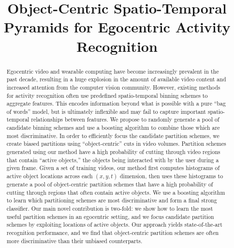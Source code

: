 \documentclass{bmvc2k}
\title{Object-Centric Spatio-Temporal Pyramids for Egocentric Activity Recognition}
\begin{document}
\maketitle

\begin{abstract}
	Egocentric video and wearable computing have become increasingly
	prevalent in the past decade, resulting in a huge explosion in the amount
	of available video content and increased attention from the computer
  vision community.
  However, existing methods for activity recognition often use
  predefined spatio-temporal binning schemes
  to aggregate features. This encodes information beyond what is possible
  with a pure ``bag of words'' model, but is ultimately inflexible
  and may fail to capture important spatio-temporal relationships between
  features.
  We propose to randomly generate a pool of candidate binning schemes and
  use a boosting algorithm to combine those which are most discriminative. 
  In order to efficiently focus the candidate partition schemes, we
  create biased partitions using ``object-centric'' cuts in video volumes.
  Partition schemes generated using our method have a high probability of
  cutting through video regions that contain ``active objects,'' the objects
  being interacted with by the user during a given frame.
  Given a set of training videos, our method first computes histograms of
  active object locations across each $(x, y, t)$ dimension, then uses these
  histograms to generate a pool of object-centric partition schemes that
  have a high probability of cutting through regions that often contain
  active objects.
	We use a boosting algorithm to learn which partitioning schemes are
  most discriminative and form a
	final strong classifier. Our main novel contribution is two-fold: we show how to learn the
  most useful partition schemes in an egocentric setting, and we focus
  candidate partition schemes by exploiting locations of active objects.
  Our approach yields state-of-the-art recognition performance, and we find
  that object-centric partition schemes are often more discriminative than
  their unbiased counterparts.
\end{abstract}

\end{document}
